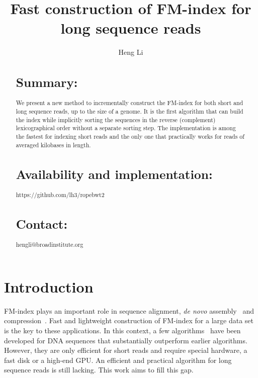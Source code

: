 \documentclass{bioinfo}
\begin{document}

\title[Constructing BWT]{Fast construction of FM-index for long sequence reads}

\author[Li]{Heng Li}

\address{Broad Institute, 7 Cambridge Center, Cambridge, MA 02142, USA}

\maketitle

\begin{abstract}
\section{Summary:} We present a new method to incrementally construct the
FM-index for both short and long sequence reads, up to the size of a genome.
It is the first algorithm that can build the index while implicitly sorting the
sequences in the reverse (complement) lexicographical order without a separate
sorting step. The implementation is among the fastest for indexing short reads
and the only one that practically works for reads of averaged kilobases in
length.

\section{Availability and implementation:} https://github.com/lh3/ropebwt2

\section{Contact:} hengli@broadinstitute.org
\end{abstract}

\section{Introduction}

FM-index plays an important role in sequence alignment, {\it de novo}
assembly~\citep{Simpson:2012aa} and compression~\citep{Cox:2012ly}. Fast
and lightweight construction of FM-index for a large data set is the key to
these applications. In this context, a few
algorithms~\citep{DBLP:journals/tcs/BauerCR13,DBLP:journals/corr/LiuLL14} have
been developed for DNA sequences that substantially outperform earlier
algorithms.  However, they are only efficient for short reads and require
special hardware, a fast disk or a high-end GPU. An efficient and practical
algorithm for long sequence reads is still lacking. This work aims to fill this
gap.
\end{document}
